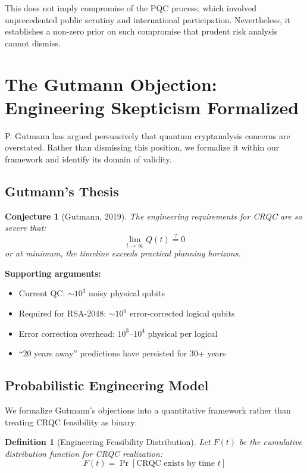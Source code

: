 \documentclass[11pt,a4paper]{article}
\newtheorem{definition}[theorem]{Definition}
\newtheorem{conjecture}[theorem]{Conjecture}
\begin{document}
This does not imply compromise of the PQC process, which involved unprecedented public scrutiny and international participation. Nevertheless, it establishes a non-zero prior on such compromise that prudent risk analysis cannot dismiss.

\section{The Gutmann Objection: Engineering Skepticism Formalized}

P. Gutmann has argued persuasively that quantum cryptanalysis concerns are overstated. Rather than dismissing this position, we formalize it within our framework and identify its domain of validity.

\subsection{Gutmann's Thesis}

\begin{conjecture}[Gutmann, 2019]
The engineering requirements for CRQC are so severe that:
\begin{equation}
\lim_{t \to \infty} Q(t) \stackrel{?}{=} 0
\end{equation}
or at minimum, the timeline exceeds practical planning horizons.
\end{conjecture}

\textbf{Supporting arguments:}
\begin{itemize}[noitemsep]
    \item Current QC: $\sim 10^3$ noisy physical qubits
    \item Required for RSA-2048: $\sim 10^6$ error-corrected logical qubits
    \item Error correction overhead: $10^3$--$10^4$ physical per logical
    \item ``20 years away'' predictions have persisted for 30+ years
\end{itemize}

\subsection{Probabilistic Engineering Model}

We formalize Gutmann's objections into a quantitative framework rather than treating CRQC feasibility as binary:

\begin{definition}[Engineering Feasibility Distribution]
Let $F(t)$ be the cumulative distribution function for CRQC realization:
\begin{equation}
F(t) = \Pr[\text{CRQC exists by time } t]
\end{equation}
\end{definition}
\end{document}
